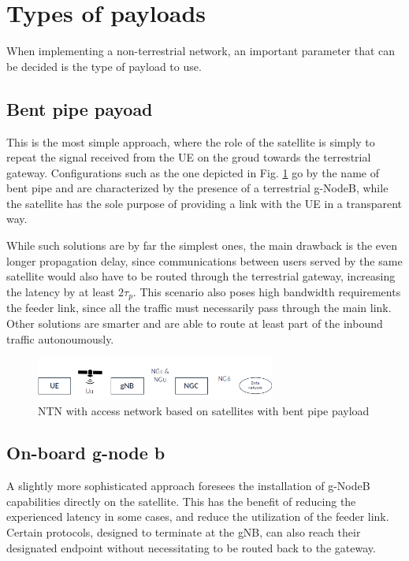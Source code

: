 \section{Types of payloads}
When implementing a non-terrestrial network, an important parameter that can be decided is the type of payload to use.
\subsection{Bent pipe payoad}
This is the most simple approach, where the role of the satellite is simply to repeat the signal received from the \ac{UE} on the groud towards the terrestrial gateway. Configurations such as the one depicted in Fig. \ref{fig:ntn-bent-pipe} go by the name of bent pipe and are characterized by the presence of a terrestrial g-NodeB, while the satellite has the sole purpose of providing a link with the \ac{UE} in a transparent way.

While such solutions are by far the simplest ones, the main drawback is the even longer propagation delay, since communications between users served by the same satellite would also have to be routed through the terrestrial gateway, increasing the latency by at least $2\tau_p$.
This scenario also poses high bandwidth requirements the feeder link, since all the traffic must necessarily pass through the main link.
Other solutions are smarter and are able to route at least part of the inbound traffic autonoumously.

\begin{figure}[ht]
    \centering
    \includegraphics[width=0.7\textwidth]{res/ntn-bent-pipe.png}
    \caption{NTN with access network based on satellites with bent pipe payload \cite{3gpp-tr-38.811}}
    \label{fig:ntn-bent-pipe}
\end{figure}

\subsection{On-board g-node b}
A slightly more sophisticated approach foresees the installation of g-NodeB capabilities directly on the satellite. This has the benefit of reducing the experienced latency in some cases, and reduce the utilization of the feeder link. Certain protocols, designed to terminate at the \ac{gNB}, can also reach their designated endpoint without necessitating to be routed back to the gateway.

